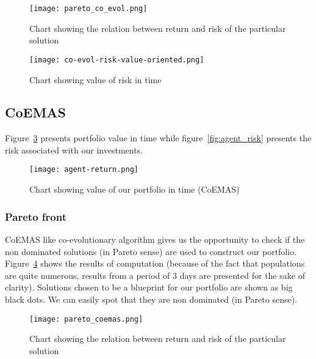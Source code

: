 \begin{figure}[ht]
  \begin{center}
    \texttt{[image: pareto\_co\_evol.png]}
  \end{center}
  \caption{Chart showing the relation between return and risk of the particular solution}
  \label{fig:pareto_co_evol}
\end{figure}


\begin{figure}[ht]
  \begin{center}
    \texttt{[image: co-evol-risk-value-oriented.png]}
  \end{center}
  \caption{Chart showing value of risk in time}
  \label{fig:co_eval_risk}
\end{figure}

\subsection{CoEMAS}

Figure~\ref{fig:agent_return} presents portfolio value in time while  figure~\ref{fig:agent_risk} presents the risk associated with our investments.

\begin{figure}[ht]
  \begin{center}
    \texttt{[image: agent-return.png]}
  \end{center}
  \caption{Chart showing value of our portfolio in time (CoEMAS)}
  \label{fig:agent_return}
\end{figure}

\subsubsection{Pareto front}

CoEMAS like co-evolutionary algorithm gives us the opportunity to check if the non dominated solutions (in Pareto sense) are used to construct our portfolio.
Figure~\ref{fig:pareto_coemas} shows the results of computation (because of the fact that populations are quite numerous,
 results from a period of 3 days are presented for the sake of clarity). 
Solutions chosen to be a blueprint for our portfolio are shown as big black dots.
We can easily spot that they are non dominated (in Pareto sense). 


\begin{figure}[ht]
  \begin{center}
    \texttt{[image: pareto\_coemas.png]}
  \end{center}
  \caption{Chart showing the relation between return and risk of the particular solution}
  \label{fig:pareto_coemas}
\end{figure}

